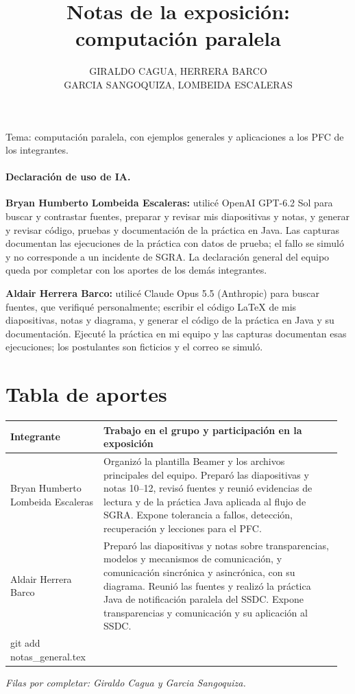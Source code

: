 \documentclass[11pt]{article}
\title{Notas de la exposición: computación paralela}
\author{GIRALDO CAGUA, HERRERA BARCO\\GARCIA SANGOQUIZA, LOMBEIDA ESCALERAS}
\date{}
\begin{document}
\maketitle
Tema: computación paralela, con ejemplos generales y aplicaciones a los PFC
de los integrantes.\par
\paragraph{Declaración de uso de IA.}
\textbf{Bryan Humberto Lombeida Escaleras:} utilicé OpenAI GPT-6.2 Sol para
buscar y contrastar fuentes, preparar y revisar mis diapositivas y notas,
y generar y revisar código, pruebas y documentación de la práctica en Java.
Las capturas documentan las ejecuciones de la práctica con datos de prueba;
el fallo se simuló y no corresponde a un incidente de SGRA.
La declaración general del equipo queda por completar con los aportes de los
demás integrantes.

\textbf{Aldair Herrera Barco:} utilicé Claude Opus 5.5 (Anthropic) para
buscar fuentes, que verifiqué personalmente;
escribir el código \LaTeX{} de mis diapositivas, notas y diagrama, y generar
el código de la práctica en Java y su documentación. Ejecuté la práctica en mi equipo y las
capturas documentan esas ejecuciones; los postulantes son ficticios y el
correo se simuló.


\section*{Tabla de aportes}
\noindent\begin{tabular}{@{}p{0.27\linewidth}p{0.69\linewidth}@{}}
\textbf{Integrante} & \textbf{Trabajo en el grupo y participación en la exposición} \\
\hline
Bryan Humberto Lombeida Escaleras &
Organizó la plantilla Beamer y los archivos principales del equipo.
Preparó las diapositivas y notas 10--12, revisó fuentes y reunió evidencias
de lectura y de la práctica Java aplicada al flujo de SGRA.
Expone tolerancia a fallos, detección, recuperación y lecciones para el PFC. \\
Aldair Herrera Barco &
Preparó las diapositivas y notas sobre transparencias, modelos y mecanismos
de comunicación, y comunicación sincrónica y asincrónica, con su diagrama.
Reunió las fuentes y realizó la práctica Java de notificación paralela del SSDC.
Expone transparencias y comunicación y su aplicación al SSDC. \\git add notas_general.tex
\end{tabular}

\noindent\textit{Filas por completar: Giraldo Cagua y Garcia Sangoquiza.}
\printbibliography
\end{document}
